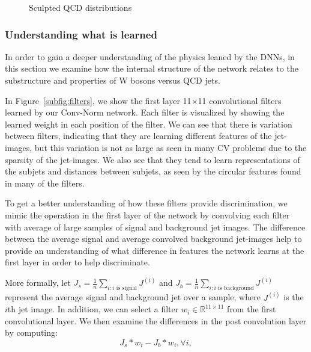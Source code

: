 \begin{figure}[htbp!]
\begin{center}
      \caption{Sculpted QCD distributions}
      \label{fig:qcdsculpt}

    \end{center}
\end{figure}

\subsubsection{Understanding what is learned} %
\label{ssub:understanding_what_is_learned}

In order to gain a deeper understanding of the physics leaned by the DNNs, in this section we examine how the internal structure of the network relates to the substructure and properties of W bosons versus QCD jets.



In Figure~\ref{subfig:filters}, we show the first layer 11$\times$11 convolutional filters learned by our Conv-Norm network. Each filter is visualized by showing the learned weight in each position of the filter.  We can see that there is variation between filters, indicating that they are learning different features of the jet-images, but this variation is not as large as seen in many CV problems due to the sparsity of the jet-images.  We also see that they tend to learn representations of the subjets and distances between subjets, as seen by the circular features found in many of the filters.

To get a better understanding of how these filters provide discrimination, we mimic the operation in the first layer of the network by convolving each filter with average of large samples of signal and background jet images.  The difference between the average signal and average convolved background jet-images help to provide an understanding of what difference in features the network learns at the first layer in order to help discriminate.

More formally, let $J_s=\frac{1}{n}\sum_{i:i\text{ is signal}} J^{(i)}$ and $J_b=\frac{1}{n}\sum_{i:i\text{ is background}}J^{(i)}$ represent the average signal and background jet over a sample, where $J^{(i)}$ is the $i$th jet image. In addition, we can select a filter $w_i\in\mathbb{R}^{11\times11}$ from the first convolutional layer. We then examine the differences in the post convolution layer by computing:
\begin{equation}
  J_s \ast w_i - J_b \ast w_i, \forall i,
\end{equation}

